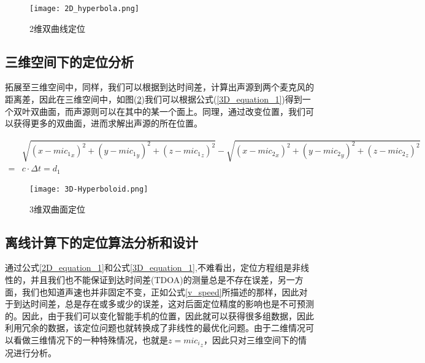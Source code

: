 \documentclass[winfonts]{njuthesis}
\begin{document}
		\begin{figure}[H]
			\centering
			\texttt{[image: 2D\_hyperbola.png]} 
			\caption{2维双曲线定位}
			\label{fig: 2D_hyperbola}
		\end{figure}		
		
		\subsection{三维空间下的定位分析}
		
		拓展至三维空间中，同样，我们可以根据到达时间差，计算出声源到两个麦克风的距离差，因此在三维空间中，如图(\ref{fig: 3D-Hyperboloid})我们可以根据公式(\ref{3D_equation_1})得到一个双叶双曲面，而声源则可以在其中的某一个面上。同理，通过改变位置，我们可以获得更多的双曲面，进而求解出声源的所在位置。
		
		\begin{equation}
		\begin{aligned}
			&\sqrt{(x-{mic_1}_x)^2+(y-{mic_1}_y)^2+(z-{mic_1}_z)^2} - \sqrt{(x-{mic_2}_x)^2+(y-{mic_2}_y)^2+(z-{mic_2}_z)^2}\\
		  = & c \cdot \Delta t= d_1 \label{3D_equation_1}
		\end{aligned}
		\end{equation}
		
		\begin{figure}[H]
			\centering
			\texttt{[image: 3D-Hyperboloid.png]} 
			\caption{3维双曲面定位}
			\label{fig: 3D-Hyperboloid}
		\end{figure}	
		
		\subsection{离线计算下的定位算法分析和设计}
		
		通过公式\ref{2D_equation_1}和公式\ref{3D_equation_1},不难看出，定位方程组是非线性的，并且我们也不能保证到达时间差(TDOA)的测量总是不存在误差，另一方面，我们也知道声速也并非固定不变，正如公式\ref{v_speed}所描述的那样，因此对于到达时间差，总是存在或多或少的误差，这对后面定位精度的影响也是不可预测的。因此，由于我们可以变化智能手机的位置，因此就可以获得很多组数据，因此利用冗余的数据，该定位问题也就转换成了非线性的最优化问题。由于二维情况可以看做三维情况下的一种特殊情况，也就是$z = {mic_i}_z$，因此只对三维空间下的情况进行分析。
		
\end{document}
